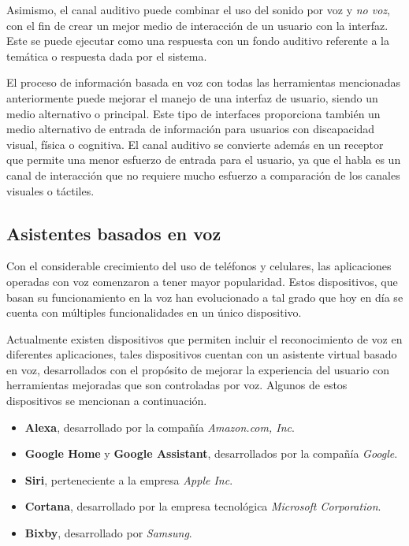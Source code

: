 Asimismo, el canal auditivo puede combinar el uso del sonido por voz y \textit{no voz}, con el fin de crear un mejor medio de interacción de un usuario con la interfaz. Este se puede ejecutar como una respuesta con un fondo auditivo referente a la temática o respuesta dada por el sistema.

El proceso de información basada en voz con todas las herramientas mencionadas anteriormente puede mejorar el manejo de una interfaz de usuario, siendo un medio alternativo o principal. Este tipo de interfaces proporciona también un medio alternativo de entrada de información para usuarios con discapacidad visual, física o cognitiva. El canal auditivo se convierte además en un receptor que permite una menor esfuerzo de entrada para el usuario, ya que el habla es un canal de interacción que no requiere mucho esfuerzo a comparación de los canales visuales o táctiles.


\subsection{Asistentes basados en voz}
\label{AsistentesBasadosVozCap3}

Con el considerable crecimiento del uso de teléfonos y celulares, las aplicaciones operadas con voz comenzaron a tener mayor popularidad. Estos dispositivos, que basan su funcionamiento en la voz han evolucionado a tal grado que hoy en día se cuenta con múltiples funcionalidades en un único dispositivo.

Actualmente existen dispositivos que permiten incluir el reconocimiento de voz en diferentes aplicaciones, tales dispositivos cuentan con un asistente virtual basado en voz, desarrollados con el propósito de mejorar la experiencia del usuario con herramientas mejoradas que son controladas por voz. Algunos de estos dispositivos se mencionan a continuación.

\begin{itemize}
  \item \textbf{Alexa}, desarrollado por la compañía \textit{Amazon.com, Inc}.
  \item \textbf{Google Home} y \textbf{Google Assistant}, desarrollados por la compañía \textit{Google}.
  \item \textbf{Siri}, perteneciente a la empresa \textit{Apple Inc}.
  \item \textbf{Cortana}, desarrollado por la empresa tecnológica \textit{Microsoft Corporation}.
  \item \textbf{Bixby}, desarrollado por \textit{Samsung}.
\end{itemize}

